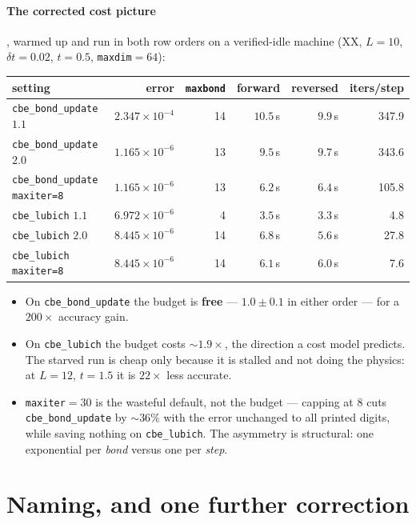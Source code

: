 \documentclass[11pt,a4paper]{article}
\newcommand{\code}[1]{\texttt{\small #1}}
\begin{document}
\paragraph{The corrected cost picture}, warmed up and run in both row orders on a verified-idle
machine (XX, $L=10$, $\delta t = 0.02$, $t=0.5$, \code{maxdim}$=64$):

\begin{center}
\begin{tabular}{@{}lrrrrr@{}}
\toprule
setting & error & \code{maxbond} & forward & reversed & iters/step \\
\midrule
\code{cbe\_bond\_update} $1.1$ & $2.347\times10^{-4}$ & 14 & $10.5\,$s & $9.9\,$s & 347.9 \\
\code{cbe\_bond\_update} $2.0$ & $1.165\times10^{-6}$ & 13 & $9.5\,$s & $9.7\,$s & 343.6 \\
\code{cbe\_bond\_update} \code{maxiter=8} & $1.165\times10^{-6}$ & 13 & $6.2\,$s & $6.4\,$s & 105.8 \\
\code{cbe\_lubich} $1.1$ & $6.972\times10^{-6}$ & 4 & $3.5\,$s & $3.3\,$s & 4.8 \\
\code{cbe\_lubich} $2.0$ & $8.445\times10^{-6}$ & 14 & $6.8\,$s & $5.6\,$s & 27.8 \\
\code{cbe\_lubich} \code{maxiter=8} & $8.445\times10^{-6}$ & 14 & $6.1\,$s & $6.0\,$s & 7.6 \\
\bottomrule
\end{tabular}
\end{center}

\begin{itemize}[leftmargin=1.2em]
\item On \code{cbe\_bond\_update} the budget is \textbf{free} --- $1.0\pm0.1$ in either order ---
for a $200\times$ accuracy gain.
\item On \code{cbe\_lubich} the budget costs $\sim1.9\times$, the direction a cost model
predicts. The starved run is cheap only because it is stalled and not doing the physics: at
$L=12$, $t=1.5$ it is $22\times$ less accurate.
\item \code{maxiter}$=30$ is the wasteful default, not the budget --- capping at $8$ cuts
\code{cbe\_bond\_update} by $\sim36\%$ with the error unchanged to all printed digits, while
saving nothing on \code{cbe\_lubich}. The asymmetry is structural: one exponential per
\emph{bond} versus one per \emph{step}.
\end{itemize}

\section{Naming, and one further correction}
\end{document}
